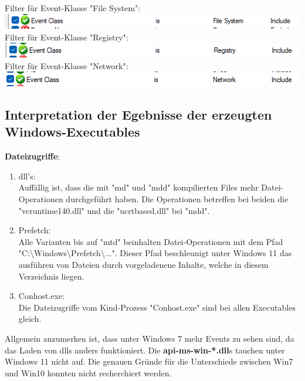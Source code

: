 \documentclass{article}
\begin{document}
	\noindent Filter für Event-Klasse "File System":\\
	\includegraphics[width=0.7\linewidth]{"pictures/1.7 event class file"}\\
	Filter für Event-Klasse "Registry":\\
	\includegraphics[width=0.7\linewidth]{"pictures/1.7 event class registry"}\\
	Filter für Event-Klasse "Network":\\
	\includegraphics[width=0.7\linewidth]{"pictures/1.7 event class network"}\\
	
	

	
	\pagebreak
	
	\subsection*{Interpretation der Egebnisse der erzeugten Windows-Executables}
	\textbf{Dateizugriffe}:\\
	\begin{enumerate}
		\item dll's:\\
		Auffällig ist, dass die mit "md" und "mdd" kompilierten Files mehr Datei-Operationen durchgeführt haben. Die Operationen betreffen bei beiden die "vcruntime140.dll" und die "ucrtbased.dll" bei "mdd".
		\item Prefetch:\\
		Alle Varianten bis auf "mtd" beinhalten Datei-Operationen mit dem Pfad "C:\textbackslash Windows\textbackslash Prefetch\textbackslash ...". Dieser Pfad beschleunigt unter Windows 11 das ausführen von Dateien durch vorgeladenene Inhalte, welche in diesem Verzeichnis liegen.
		\item Conhost.exe:\\
		Die Dateizugriffe vom Kind-Prozess "Conhost.exe" sind bei allen Executables gleich.
	\end{enumerate}
	\begin{mynote}
		Allgemein anzumerken ist, dass unter Windows 7 mehr Events zu sehen sind, da das Laden von dlls anders funktioniert. Die \textbf{api-ms-win-*.dll}s tauchen unter Windows 11 nicht auf. Die genauen Gründe für die Unterschiede zwischen Win7 und Win10 konnten nicht recherchiert werden.\\
	\end{mynote}
	
\end{document}
